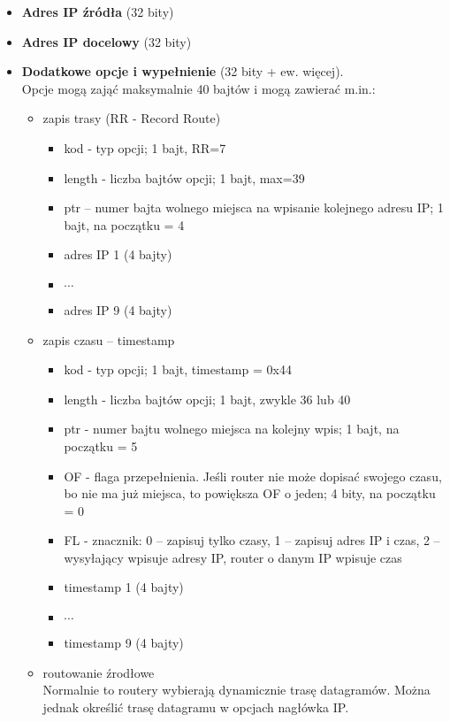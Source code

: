 \documentclass[a4paper]{article}
\begin{document}
\begin{itemize}
    \item \textbf{Adres IP źródła} (32 bity)
    \item \textbf{Adres IP docelowy} (32 bity)
    \item \textbf{Dodatkowe opcje i wypełnienie} (32 bity + ew. więcej).\\
    Opcje mogą zająć maksymalnie 40 bajtów i mogą zawierać m.in.:
    \begin{itemize}
        \item zapis trasy (RR - Record Route)\\
        \begin{itemize}
            \item kod - typ opcji; 1 bajt, RR=7
            \item length - liczba bajtów opcji; 1 bajt, max=39
            \item ptr – numer bajta wolnego miejsca na wpisanie kolejnego adresu IP; 1 bajt, na początku = 4
            \item adres IP 1 (4 bajty)
            \item $\cdots$
            \item adres IP 9 (4 bajty)
        \end{itemize}
        \item zapis czasu – timestamp
        \begin{itemize}
            \item kod - typ opcji; 1 bajt,  timestamp = 0x44
            \item  length - liczba bajtów opcji; 1 bajt, zwykle 36 lub 40
            \item ptr - numer bajtu wolnego miejsca na kolejny wpis; 1 bajt, na początku = 5
            \item OF - flaga przepełnienia. Jeśli router nie może dopisać swojego czasu, bo nie ma już miejsca, to powiększa OF o jeden; 4 bity, na początku = 0
            \item FL - znacznik: 0 – zapisuj tylko czasy, 1 – zapisuj adres IP i czas, 2 – wysyłający wpisuje adresy IP, router o danym IP wpisuje czas
            \item timestamp 1 (4 bajty)
            \item $\cdots$
            \item timestamp 9 (4 bajty)
        \end{itemize}
        \item routowanie źrodłowe\\
        Normalnie to routery wybierają dynamicznie trasę datagramów. Można jednak określić trasę datagramu w opcjach nagłówka IP.

\end{itemize}
\end{itemize}
\end{document}
